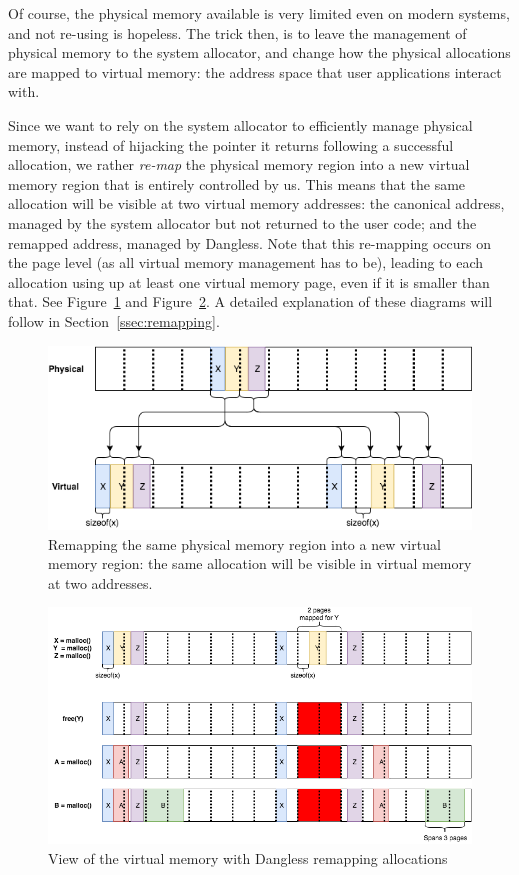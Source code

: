 Of course, the physical memory available is very limited even on modern systems, and not re-using is hopeless. The trick then, is to leave the management of physical memory to the system allocator, and change how the physical allocations are mapped to virtual memory: the address space that user applications interact with.

Since we want to rely on the system allocator to efficiently manage physical memory, instead of hijacking the pointer it returns following a successful allocation, we rather \emph{re-map} the physical memory region into a new virtual memory region that is entirely controlled by us. This means that the same allocation will be visible at two virtual memory addresses: the canonical address, managed by the system allocator but not returned to the user code; and the remapped address, managed by Dangless. Note that this re-mapping occurs on the page level (as all virtual memory management has to be), leading to each allocation using up at least one virtual memory page, even if it is smaller than that. See Figure~\ref{fig:dangless_virtremap_mappings} and Figure~\ref{fig:dangless_virtremap_view}. A detailed explanation of these diagrams will follow in Section~\ref{ssec:remapping}.

\begin{figure}
	\centering
	\includegraphics[width=\textwidth]{img/dangless_virtremap_mappings_xyz.png}
	\caption{Remapping the same physical memory region into a new virtual memory region: the same allocation will be visible in virtual memory at two addresses.}
	\label{fig:dangless_virtremap_mappings}
\end{figure}

\begin{figure}
	\centering
	\includegraphics[width=\textwidth]{img/dangless_virtremap.png}
	\caption{View of the virtual memory with Dangless remapping allocations}
	\label{fig:dangless_virtremap_view}
\end{figure}

